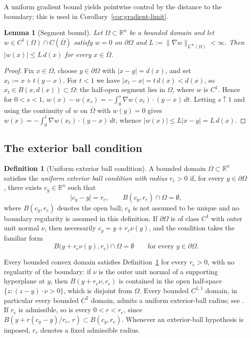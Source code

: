 \documentclass[11pt]{article}
\newcommand{\R}{\mathbb R}
\newcommand{\abs}[1]{\lvert #1\rvert}
\newcommand{\norm}[1]{\lVert #1\rVert}
\newtheorem{lemma}[theorem]{Lemma}
\theoremstyle{definition}
\newtheorem{definition}[theorem]{Definition}
\theoremstyle{remark}
\begin{document}
A uniform gradient bound yields pointwise control by the distance to the
boundary; this is used in Corollary~\ref{cor:gradient-limit}.
\begin{lemma}[Segment bound]\label{lem:segment}
Let $\Omega\subset\R^n$ be a bounded domain and let
$w\in C^1(\Omega)\cap C(\overline\Omega)$ satisfy $w=0$ on $\partial\Omega$ and
$L:=\norm{\nabla w}_{L^\infty(\Omega)}<\infty$. Then
$\abs{w(x)}\le L\,d(x)$ for every $x\in\Omega$.
\end{lemma}
\begin{proof}
Fix $x\in\Omega$, choose $y\in\partial\Omega$ with $\abs{x-y}=d(x)$, and set
$x_t:=x+t(y-x)$. For $t<1$ we have $\abs{x_t-x}=t\,d(x)<d(x)$, so
$x_t\in B(x,d(x))\subset\Omega$: the half-open segment lies in $\Omega$, where
$w$ is $C^1$. Hence for $0<s<1$,
$w(x)-w(x_s)=-\int_0^s\nabla w(x_t)\cdot(y-x)\,dt$. Letting $s\uparrow1$ and
using the continuity of $w$ on $\overline\Omega$ with $w(y)=0$ gives
$w(x)=-\int_0^1\nabla w(x_t)\cdot(y-x)\,dt$, whence
$\abs{w(x)}\le L\abs{x-y}=L\,d(x)$.
\end{proof}

\subsection{The exterior ball condition}
\begin{definition}[Uniform exterior ball condition]\label{def:ext-ball}
A bounded domain $\Omega\subset\R^n$ satisfies the \emph{uniform exterior ball
condition with radius $r_e>0$} if, for every $y\in\partial\Omega$, there
exists $c_y\in\R^n$ such that
\[
\abs{c_y-y}=r_e,
\qquad B(c_y,r_e)\cap\Omega=\emptyset,
\]
where $B(c_y,r_e)$ denotes the open ball; $c_y$ is not assumed to be unique
and no boundary regularity is assumed in this definition. If
$\partial\Omega$ is of class $C^1$ with outer unit normal $\nu$, then
necessarily $c_y=y+r_e\nu(y)$, and the condition takes the familiar form
\begin{equation}\label{eq:ext-ball}
B\bigl(y+r_e\nu(y),r_e\bigr)\cap\Omega=\emptyset
\qquad\text{for every }y\in\partial\Omega .
\end{equation}
\end{definition}
Every bounded convex domain satisfies Definition~\ref{def:ext-ball} for every
$r_e>0$, with no regularity of the boundary: if $\nu$ is the outer unit normal
of a supporting hyperplane at $y$, then $B(y+r_e\nu,r_e)$ is contained in the
open half-space $\{z:(z-y)\cdot\nu>0\}$, which is disjoint from $\Omega$. Every
bounded $C^{1,1}$ domain, in particular every bounded $C^2$ domain, admits a
uniform exterior-ball radius; see \cite[Section~14.6]{GT}. If $r_e$ is admissible, so is every $0<r<r_e$, since
$B(y+r(c_y-y)/r_e,\,r)\subset B(c_y,r_e)$. Whenever an exterior-ball hypothesis
is imposed, $r_e$ denotes a fixed admissible radius.
\end{document}
